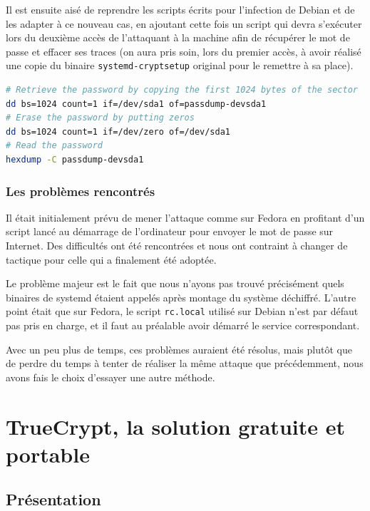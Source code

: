 \documentclass[12pt,a4paper]{article}
\begin{document}
Il est ensuite aisé de reprendre les scripts écrits pour l'infection de Debian et de les adapter à ce nouveau cas, en ajoutant cette fois un script qui devra s'exécuter lors du deuxième accès de l'attaquant à la machine afin de récupérer le mot de passe et effacer ses traces (on aura pris soin, lors du premier accès, à avoir réalisé une copie du binaire \texttt{systemd-cryptsetup} original pour le remettre à sa place).

\begin{lstlisting}[language=Bash]
# Retrieve the password by copying the first 1024 bytes of the sector
dd bs=1024 count=1 if=/dev/sda1 of=passdump-devsda1
# Erase the password by putting zeros
dd bs=1024 count=1 if=/dev/zero of=/dev/sda1
# Read the password
hexdump -C passdump-devsda1
\end{lstlisting}


\subsubsection*{Les problèmes rencontrés}

Il était initialement prévu de mener l'attaque comme sur Fedora en profitant d'un script lancé au démarrage de l'ordinateur pour envoyer le mot de passe sur Internet. Des difficultés ont été rencontrées et nous ont contraint à changer de tactique pour celle qui a finalement été adoptée.

Le problème majeur est le fait que nous n'ayons pas trouvé précisément quels binaires de systemd étaient appelés après montage du système déchiffré. L'autre point était que sur Fedora, le script \texttt{rc.local} utilisé sur Debian n'est par défaut pas pris en charge, et il faut au préalable avoir démarré le service correspondant.

Avec un peu plus de temps, ces problèmes auraient été résolus, mais plutôt que de perdre du temps à tenter de réaliser la même attaque que précédemment, nous avons fais le choix d'essayer une autre méthode.


\section{TrueCrypt, la solution gratuite et portable}

\subsection{Présentation}
\end{document}
